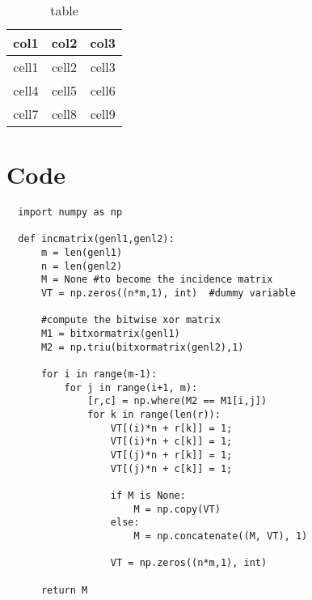 \begin{table}[h!]
  \centering
  \begin{tabular}{||c c c ||}
    \hline
    col1  & col2  & col3  \\
    \hline\hline
    cell1 & cell2 & cell3 \\\hline
    cell4 & cell5 & cell6 \\\hline
    cell7 & cell8 & cell9 \\\hline
  \end{tabular}
  \caption{table}
  \label{tab:tabular}
\end{table}


\section{Code}

\begin{verbatim}
  import numpy as np

  def incmatrix(genl1,genl2):
      m = len(genl1)
      n = len(genl2)
      M = None #to become the incidence matrix
      VT = np.zeros((n*m,1), int)  #dummy variable

      #compute the bitwise xor matrix
      M1 = bitxormatrix(genl1)
      M2 = np.triu(bitxormatrix(genl2),1)

      for i in range(m-1):
          for j in range(i+1, m):
              [r,c] = np.where(M2 == M1[i,j])
              for k in range(len(r)):
                  VT[(i)*n + r[k]] = 1;
                  VT[(i)*n + c[k]] = 1;
                  VT[(j)*n + r[k]] = 1;
                  VT[(j)*n + c[k]] = 1;

                  if M is None:
                      M = np.copy(VT)
                  else:
                      M = np.concatenate((M, VT), 1)

                  VT = np.zeros((n*m,1), int)

      return M
\end{verbatim}
